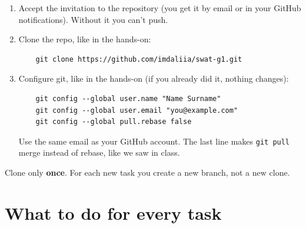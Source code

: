 \documentclass[11pt, a4paper]{article}
\begin{document}
\begin{enumerate}
  \item Accept the invitation to the repository (you get it by email or in your GitHub notifications). Without it you can't push.
  \item Clone the repo, like in the hands-on:
    \vspace{-0.8em}
    \begin{verbatim}
    git clone https://github.com/imdaliia/swat-g1.git
    \end{verbatim}
    \vspace{-1.6em}

  \item Configure git, like in the hands-on (if you already did it, nothing changes):
    \vspace{-0.8em}
    \begin{verbatim}
    git config --global user.name "Name Surname"
    git config --global user.email "you@example.com"
    git config --global pull.rebase false
    \end{verbatim}
    \vspace{-1.6em}
    Use the same email as your GitHub account. The last line makes \texttt{git pull} merge instead of rebase, like we saw in class.
\end{enumerate}

Clone only \textbf{once}. For each new task you create a new branch, not a new clone.

\section{What to do for every task}
\end{document}
